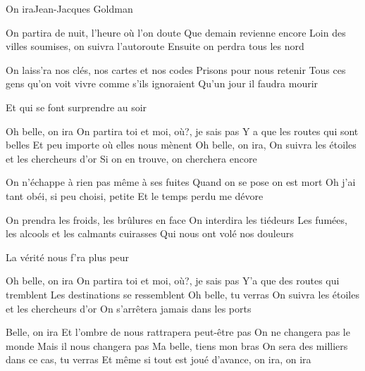 \begin{Song}{On ira}{Jean-Jacques Goldman}

\begin{multicols}{2}
\begin{Verse}
On partira de nuit, l'heure o\`{u} l'on doute
Que demain revienne encore
Loin des villes soumises, on suivra l'autoroute
Ensuite on perdra tous les nord
\espaceInterStrophe

On laiss'ra nos cl\'{e}s, nos cartes et nos codes
Prisons pour nous retenir
Tous ces gens qu'on voit vivre comme s'ils ignoraient
Qu'un jour il faudra mourir
\end{Verse}
\espaceInterStrophe

\begin{Bridge}
Et qui se font surprendre au soir
\end{Bridge}
\espaceInterStrophe

\begin{Chorus}
Oh belle, on ira
On partira toi et moi, o\`{u}?, je sais pas
Y a que les routes qui sont belles
Et peu importe o\`{u} elles nous m\`{e}nent
Oh belle, on ira,
On suivra les \'{e}toiles et les chercheurs d'or
Si on en trouve, on cherchera encore
\end{Chorus}
\vfill
\columnbreak

\begin{Verse}
On n'\'{e}chappe \`{a} rien pas m\^{e}me \`{a} ses fuites
Quand on se pose on est mort
Oh j'ai tant ob\'{e}i, si peu choisi, petite
Et le temps perdu me d\'{e}vore
\espaceInterStrophe

On prendra les froids, les br\^{u}lures en face
On interdira les ti\'{e}deurs
Les fum\'{e}es, les alcools et les calmants cuirasses
Qui nous ont vol\'{e} nos douleurs
\end{Verse}
\espaceInterStrophe

\begin{Bridge}
La v\'{e}rit\'{e} nous f'ra plus peur
\end{Bridge}
\espaceInterStrophe

\begin{Chorus}
Oh belle, on ira
On partira toi et moi, o\`{u}?, je sais pas
Y'a que des routes qui tremblent
Les destinations se ressemblent
Oh belle, tu verras
On suivra les \'{e}toiles et les chercheurs d'or
On s'arr\^{e}tera jamais dans les ports
\end{Chorus}
\espaceInterStrophe

\begin{Chorus}
Belle, on ira
Et l'ombre de nous rattrapera peut-\^{e}tre pas
On ne changera pas le monde
Mais il nous changera pas
Ma belle, tiens mon bras
On sera des milliers dans ce cas, tu verras
Et m\^{e}me si tout est jou\'{e} d'avance, on ira, on ira
\end{Chorus}
\end{multicols}
\vfill
\begin{multicols}{2}


\end{multicols}
\end{Song}
